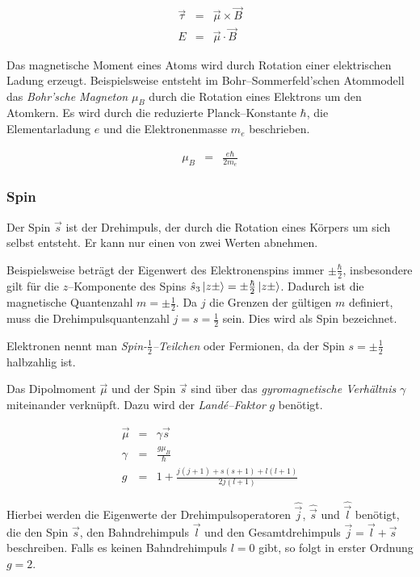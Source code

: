 \documentclass[12pt,a4paper]{scrartcl}
\numberwithin{equation}{section} %
\begin{document}
\begin{eqnarray}
	\vec \tau &=& \vec \mu \times \vec B \\
	E &=& \vec \mu \cdot \vec B \label{eq:EDipol}
\end{eqnarray}

\noindent
Das magnetische Moment eines Atoms wird durch Rotation einer elektrischen Ladung erzeugt. Beispielsweise entsteht im Bohr--Sommerfeld'schen Atommodell das \emph{Bohr'sche Magneton} $\mu_B$ durch die Rotation eines Elektrons um den Atomkern. Es wird durch die reduzierte Planck--Konstante $\hbar$, die Elementarladung $e$ und die Elektronenmasse $m_e$ beschrieben.

\begin{eqnarray}
	\mu_B &=& \frac{e\hbar}{2m_e}
\end{eqnarray}

\hypertarget{spin}{ \subsubsection{Spin}\label{spin}}

Der Spin $\vec s$ ist der Drehimpuls, der durch die Rotation eines Körpers um sich selbst entsteht. Er kann nur einen von zwei Werten abnehmen.

Beispielsweise beträgt der Eigenwert des Elektronenspins immer $\pm\frac{\hbar}{2}$, insbesondere gilt für die $z$--Komponente des Spins $\hat s_3\ket{z\pm}=\pm\frac{\hbar}{2}\ket{z\pm}$. Dadurch ist die magnetische Quantenzahl $m=\pm\frac{1}{2}$. Da $j$ die Grenzen der gültigen $m$ definiert, muss die Drehimpulsquantenzahl $j=s=\frac{1}{2}$ sein. Dies wird als Spin bezeichnet.

Elektronen nennt man \emph{Spin-$\frac{1}{2}$--Teilchen} oder Fermionen, da der Spin $s=\pm\frac{1}{2}$ halbzahlig ist.

Das Dipolmoment $\vec \mu$ und der Spin $\vec s$ sind über das \emph{gyromagnetische Verhältnis} $\gamma$ miteinander verknüpft. Dazu wird der \emph{Landé--Faktor} $g$ benötigt.

\begin{eqnarray}
	\vec \mu &=& \gamma \vec{s} \label{eq:dipolmomentSpin} \\
	\gamma &=& \frac{g\mu_B}{\hbar} \label{eq:gyromag} \\
	g &=& 1 + \frac{j(j+1) + s(s+1) + l(l+1)}{2j(l+1)}
\end{eqnarray}

\noindent
Hierbei werden die Eigenwerte der Drehimpulsoperatoren $\hat{\vec j}$, $\hat{\vec s}$ und $\hat{\vec l}$ benötigt, die den Spin $\vec s$, den Bahndrehimpuls $\vec l$ und den Gesamtdrehimpuls $\vec j = \vec l + \vec s$ beschreiben. Falls es keinen Bahndrehimpuls $l=0$ gibt, so folgt in erster Ordnung $g=2$.
\end{document}
